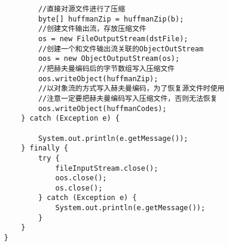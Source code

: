 \documentclass[a4paper]{report}
\begin{document}
\begin{lstlisting}
            //直接对源文件进行了压缩
            byte[] huffmanZip = huffmanZip(b);
            //创建文件输出流，存放压缩文件
            os = new FileOutputStream(dstFile);
            //创建一个和文件输出流关联的ObjectOutStream
            oos = new ObjectOutputStream(os);
            //把赫夫曼编码后的字节数组写入压缩文件
            oos.writeObject(huffmanZip);
            //以对象流的方式写入赫夫曼编码，为了恢复源文件时使用
            //注意一定要把赫夫曼编码写入压缩文件，否则无法恢复
            oos.writeObject(huffmanCodes);
        } catch (Exception e) {

            System.out.println(e.getMessage());
        } finally {
            try {
                fileInputStream.close();
                oos.close();
                os.close();
            } catch (Exception e) {
                System.out.println(e.getMessage());
            }
        }
    }
\end{lstlisting}
\end{document}
